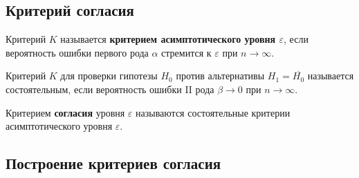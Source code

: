 \subsection{Критерий согласия}

\begin{definition}
    Критерий \(K\) называется \textbf{критерием асимптотического уровня \(\varepsilon\)}, если вероятность ошибки первого рода \(\alpha\) стремится к \(\varepsilon\) при \(n \to \infty\).
\end{definition}

\begin{definition}
    Критерий \(K\) для проверки гипотезы \(H_0\) против альтернативы \(H_1 = \overline{H_0}\) называется состоятельным, если вероятность ошибки II рода \(\beta \to 0\) при \(n \to \infty\).
\end{definition}

\begin{definition}
    Критерием \textbf{согласия} уровня \(\varepsilon\) называются состоятельные критерии асимптотического уровня \(\varepsilon\).
\end{definition}

\subsection{Построение критериев согласия}

